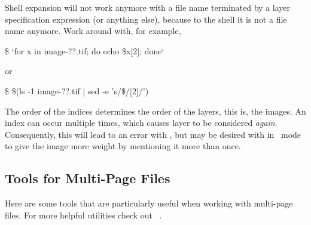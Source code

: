 \begin{geeknote}
  Shell expansion will not work anymore with a file name terminated by a layer specification
  expression (or anything else), because to the shell it is not a file name anymore.  Work
  around with, for example,

  \begin{terminal}
    \$ \app{} `for x in image-??.tif; do echo \$x[2]; done`
  \end{terminal}

  \noindent or

  \begin{terminal}
    \$ \app{} \$(ls -1 image-??.tif | sed -e 's/\$/[2]/')
  \end{terminal}

  The order of the indices determines the order of the layers, this is, the images.  An index
  can occur multiple times, which causes layer to be considered \emph{again}.  Consequently,
  this will lead to an error with , but may be desired with
   in ~mode to give the image more weight by mentioning it
  more than once.
\end{geeknote}


\subsection[Tools for Multi-Page Files]{\label{sec:tools-for-multi-page-files}%
  Tools for Multi-Page Files}

Here are some tools that are particularly useful when working with multi-page files.  For more
helpful utilities check out \appendixName~.

